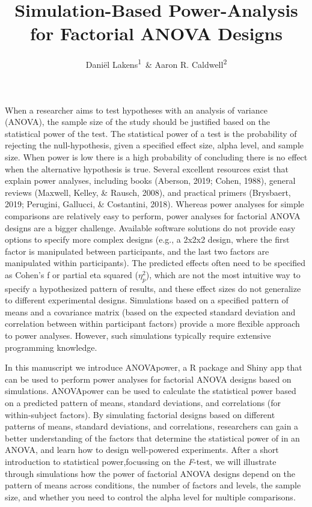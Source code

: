 \documentclass[,jou,floatsintext]{apa6}
\title{Simulation-Based Power-Analysis for Factorial ANOVA Designs}
\author{Daniël Lakens\textsuperscript{1}~\& Aaron R. Caldwell\textsuperscript{2}}
\date{}
\affiliation{
\vspace{0.5cm}
\textsuperscript{1} Eindhoven University of Technology, The Netherlands\\\textsuperscript{2} Department of Health, Human Performance and Recreation, University of Arkansas, USA}
\begin{document}
\maketitle

When a researcher aims to test hypotheses with an analysis of variance (ANOVA), the sample size of the study should be justified based on the statistical power of the test.
The statistical power of a test is the probability of rejecting the null-hypothesis, given a specified effect size, alpha level, and sample size.
When power is low there is a high probability of concluding there is no effect when the alternative hypothesis is true.
Several excellent resources exist that explain power analyses, including books (Aberson, 2019; Cohen, 1988), general reviews (Maxwell, Kelley, \& Rausch, 2008), and practical primers (Brysbaert, 2019; Perugini, Gallucci, \& Costantini, 2018).
Whereas power analyses for simple comparisons are relatively easy to perform, power analyses for factorial ANOVA designs are a bigger challenge.
Available software solutions do not provide easy options to specify more complex designs (e.g., a 2x2x2 design, where the first factor is manipulated between participants, and the last two factors are manipulated within participants).
The predicted effects often need to be specified as Cohen's f or partial eta squared (\(\eta_p^2\)), which are not the most intuitive way to specify a hypothesized pattern of results, and these effect sizes do not generalize to different experimental designs.
Simulations based on a specified pattern of means and a covariance matrix (based on the expected standard deviation and correlation between within participant factors) provide a more flexible approach to power analyses.
However, such simulations typically require extensive programming knowledge.

In this manuscript we introduce ANOVApower, a R package and Shiny app that can be used to perform power analyses for factorial ANOVA designs based on simulations.
ANOVApower can be used to calculate the statistical power based on a predicted pattern of means, standard deviations, and correlations (for within-subject factors).
By simulating factorial designs based on different patterns of means, standard deviations, and correlations, researchers can gain a better understanding of the factors that determine the statistical power of in an ANOVA, and learn how to design well-powered experiments.
After a short introduction to statistical power,focussing on the \emph{F}-test, we will illustrate through simulations how the power of factorial ANOVA designs depend on the pattern of means across conditions, the number of factors and levels, the sample size, and whether you need to control the alpha level for multiple comparisons.
\end{document}
